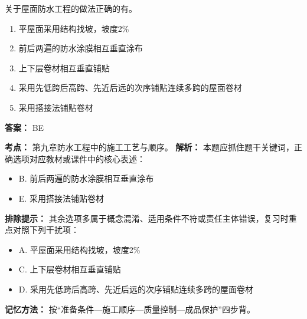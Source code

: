 \documentclass[UTF8,fontset=fandol,11pt]{ctexart}
\begin{document}
\begin{quizbox}[title={第 3 题}]
关于屋面防水工程的做法正确的有。\\
\begin{enumerate}[label=\Alph*.]
\item 平屋面采用结构找坡，坡度2\%
\item 前后两遍的防水涂膜相互垂直涂布
\item 上下层卷材相互垂直铺贴
\item 采用先低跨后高跨、先近后远的次序铺贴连续多跨的屋面卷材
\item 采用搭接法铺贴卷材
\end{enumerate}
\textbf{答案：} BE
\vspace{0.25em}
\begin{answerbox}[title={考点解析}]
\textbf{考点：} 第九章防水工程中的施工工艺与顺序。
\textbf{解析：} 本题应抓住题干关键词，正确选项对应教材或课件中的核心表述：
\begin{itemize}
\item B. 前后两遍的防水涂膜相互垂直涂布
\item E. 采用搭接法铺贴卷材
\end{itemize}
\textbf{排除提示：} 其余选项多属于概念混淆、适用条件不符或责任主体错误，复习时重点对照下列干扰项：
\begin{itemize}
\item A. 平屋面采用结构找坡，坡度2\%
\item C. 上下层卷材相互垂直铺贴
\item D. 采用先低跨后高跨、先近后远的次序铺贴连续多跨的屋面卷材
\end{itemize}
\textbf{记忆方法：} 按“准备条件—施工顺序—质量控制—成品保护”四步背。
\end{answerbox}
\end{quizbox}

\vspace{0.2em}
\end{document}

